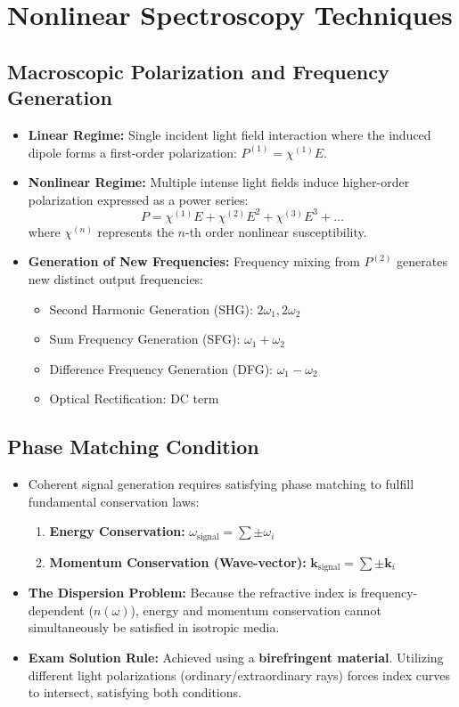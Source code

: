 
\chapter{Nonlinear Spectroscopy Techniques}

\section{Macroscopic Polarization and Frequency Generation}

\begin{itemize}
  \item \textbf{Linear Regime:} Single incident light field interaction where the induced dipole forms a first-order polarization: $P^{(1)} = \chi^{(1)}E$.
  \item \textbf{Nonlinear Regime:} Multiple intense light fields induce higher-order polarization expressed as a power series:
  \begin{equation}
    P = \chi^{(1)}E + \chi^{(2)}E^2 + \chi^{(3)}E^3 + \dots
  \end{equation}
  where $\chi^{(n)}$ represents the $n$-th order nonlinear susceptibility.
  \item \textbf{Generation of New Frequencies:} Frequency mixing from $P^{(2)}$ generates new distinct output frequencies:
  \begin{itemize}
    \item Second Harmonic Generation (SHG): $2\omega_1, 2\omega_2$ 
    \item Sum Frequency Generation (SFG): $\omega_1 + \omega_2$ 
    \item Difference Frequency Generation (DFG): $\omega_1 - \omega_2$ 
    \item Optical Rectification: DC term 
  \end{itemize}
\end{itemize}

\section{Phase Matching Condition}
\begin{itemize}
  \item Coherent signal generation requires satisfying phase matching to fulfill fundamental conservation laws:
  \begin{enumerate}
    \item \textbf{Energy Conservation:} $\omega_\text{signal} = \sum \pm \omega_i$ 
    \item \textbf{Momentum Conservation (Wave-vector):} $\bm k_\text{signal} = \sum \pm \bm k_i$ 
  \end{enumerate}
  \item \textbf{The Dispersion Problem:} Because the refractive index is frequency-dependent ($n(\omega)$), energy and momentum conservation cannot simultaneously be satisfied in isotropic media.
  \item \textbf{Exam Solution Rule:} Achieved using a \textbf{birefringent material}. Utilizing different light polarizations (ordinary/extraordinary rays) forces index curves to intersect, satisfying both conditions.
\end{itemize}

